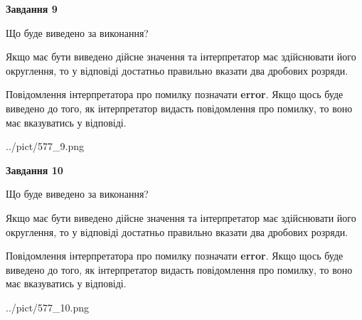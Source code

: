 \documentclass[12pt, ukrainian]{article}
\begin{document}
{\begin {Large}
{\begin {center}\textbf{Завдання 9}\end {center}}\par
Що буде виведено за виконання? \par

Якщо має бути виведено дійсне значення та інтерпретатор має здійснювати його округлення, 
то у відповіді достатньо правильно вказати два дробових розряди.

Повідомлення інтерпретатора про помилку позначати \textbf{error}.
Якщо щось буде виведено до того, як інтерпретатор видасть повідомлення про помилку, 
то воно має вказуватись у відповіді. \par

\begin{center}
	{../pict/577_9.png}
\end{center}
\newpage

{\begin {center}\textbf{Завдання 10}\end {center}}\par
Що буде виведено за виконання? \par

Якщо має бути виведено дійсне значення та інтерпретатор має здійснювати його округлення, 
то у відповіді достатньо правильно вказати два дробових розряди.

Повідомлення інтерпретатора про помилку позначати \textbf{error}.
Якщо щось буде виведено до того, як інтерпретатор видасть повідомлення про помилку, 
то воно має вказуватись у відповіді. \par

\begin{center}
	{../pict/577_10.png}
\end{center}
\newpage

\end {Large}}
\end{document}
